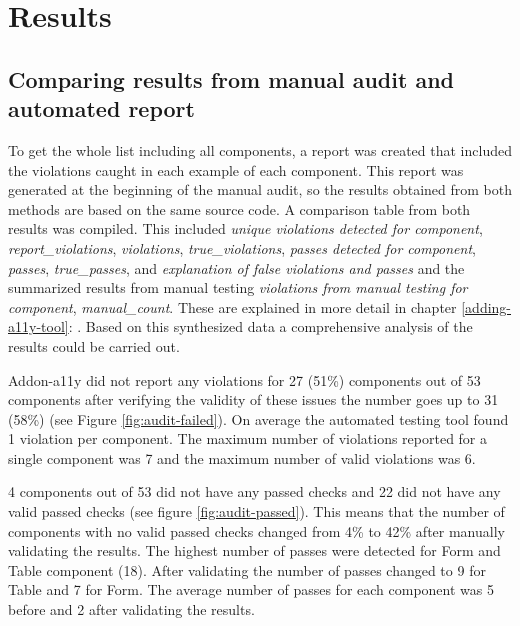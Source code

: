 \documentclass{master_thesis}
\begin{document}
\section{Results}



\subsection{Comparing results from manual audit and automated report}

To get the whole list including all components, a report was created that included the violations caught in each example of each component. This report was generated at the beginning of the manual audit, so the results obtained from both methods are based on the same source code. A comparison table from both results was compiled. This included \textit{unique violations detected for component}, \textit{report\_violations}, \textit{violations}, \textit{true\_violations}, \textit{passes detected for component}, \textit{passes}, \textit{true\_passes}, and \textit{explanation of false violations and passes} and the summarized results from manual testing \textit{violations from manual testing for component}, \textit{manual\_count}. These are explained in more detail in chapter \ref{adding-a11y-tool}: . Based on this synthesized data a comprehensive analysis of the results could be carried out.

Addon-a11y did not report any violations for 27 (51\%) components out of 53 components after verifying the validity of these issues the number goes up to 31 (58\%) (see Figure \ref{fig:audit-failed}). On average the automated testing tool found 1 violation per component. The maximum number of violations reported for a single component was 7 and the maximum number of valid violations was 6.

4 components out of 53 did not have any passed checks and 22 did not have any valid passed checks (see figure \ref{fig:audit-passed}). This means that the number of components with no valid passed checks changed from 4\%  to 42\% after manually validating the results. The highest number of passes were detected for Form and Table component (18). After validating the number of passes changed to 9 for Table and 7 for Form. The average number of passes for each component was 5 before and 2 after validating the results.
\end{document}
